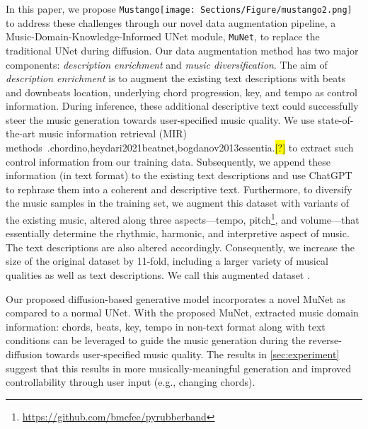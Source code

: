 \documentclass[11pt]{article}
\let\realcite\cite
\renewcommand{\cite}[1]{\ifx.#1.\hl{[?]}\else\realcite{#1}\fi}
\newcommand{\model}{\texttt{Mustango}}
\newcommand{\modelemoji}{\model{}\texttt{[image: Sections/Figure/mustango2.png]}}
\begin{document}
In this paper, we propose \modelemoji{} to address these challenges through our novel data augmentation pipeline, a Music-Domain-Knowledge-Informed UNet module, \texttt{MuNet}, to replace the traditional UNet during diffusion. Our data augmentation method has two major components: \emph{description enrichment} and \emph{music diversification}. The aim of \emph{description enrichment} is to augment the existing text descriptions with beats and downbeats location, underlying chord progression, key, and tempo as control information. During inference, these additional descriptive text could successfully steer the music generation towards user-specified music quality. We use state-of-the-art music information retrieval (MIR) methods~\cite{chordino,heydari2021beatnet,bogdanov2013essentia} to extract such control information from our training data. Subsequently, we append these information (in text format) to the existing text descriptions and use ChatGPT to rephrase them into a coherent and descriptive text. 
Furthermore, to diversify the music samples in the training set, we augment this dataset with variants of the existing music, altered along three aspects---tempo, pitch\footnote{\url{https://github.com/bmcfee/pyrubberband}}, and volume---that essentially determine the rhythmic, harmonic, and interpretive aspect of music. The text descriptions are also altered accordingly. Consequently, we increase the size of the original dataset by 11-fold, including a larger variety of musical qualities as well as text descriptions. We call this augmented dataset \dataset{}.

Our proposed diffusion-based generative model incorporates a novel MuNet as compared to a normal UNet. With the proposed MuNet, extracted music domain information: chords, beats, key, tempo in non-text format along with text conditions can be leveraged to guide the music generation during the reverse-diffusion towards user-specified music quality. The results in \cref{sec:experiment} suggest that this results in more musically-meaningful generation and improved controllability through user input (e.g., changing chords).
\end{document}
